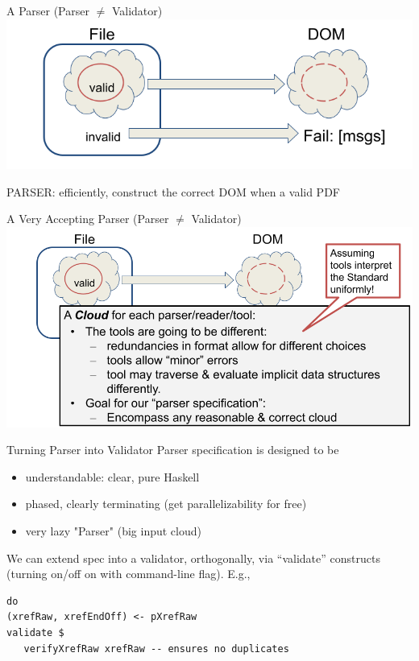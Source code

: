 \documentclass[t,10pt,xcolor={dvipsnames}]{beamer}
\begin{document}
\begin{frame}[label={sec:org3a0ac1e}]{A Parser (Parser \(\neq\) Validator)}
\vspace{10pt}
\includegraphics[width=0.80\linewidth]{images/pNEQv-2.png}
\vfill

PARSER: efficiently, construct the correct DOM when a valid PDF
\end{frame}

\begin{frame}[label={sec:org1a9eeef}]{A Very Accepting Parser (Parser \(\neq\) Validator)}
\vspace{10pt}
\includegraphics[width=0.95\linewidth]{images/pNEQv-3.png}
\end{frame}

\begin{frame}[label={sec:org5f3f0ef},fragile]{Turning Parser into Validator}
 Parser specification is designed to be
\begin{itemize}
\item understandable: clear, pure Haskell
\item phased, clearly terminating (get parallelizability for free)
\item very lazy "Parser" (big input cloud)
\end{itemize}

We can extend spec into a validator, orthogonally, via “validate” constructs
(turning on/off on with command-line flag).  E.g.,
\lstset{language=haskell,label= ,caption= ,captionpos=b,numbers=none}
\begin{lstlisting}
do
(xrefRaw, xrefEndOff) <- pXrefRaw
validate $
   verifyXrefRaw xrefRaw -- ensures no duplicates
\end{lstlisting}
\end{frame}
\end{document}
